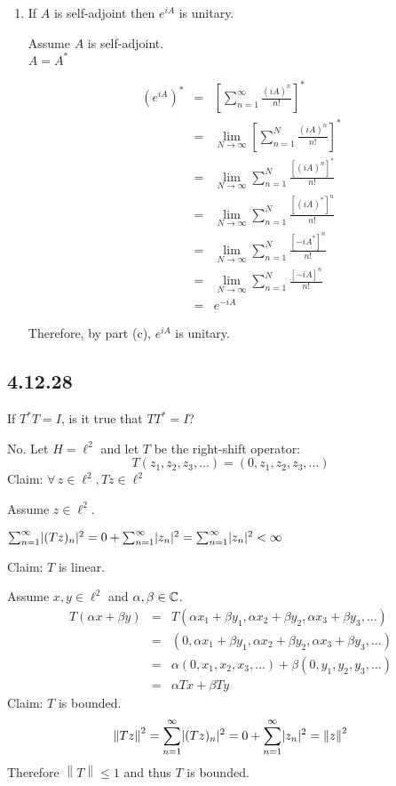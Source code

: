 \documentclass[letterpaper,12pt,fleqn]{article}
\newcommand{\norm}[1]{\left\|#1\right\|}
\renewcommand{\a}{\alpha}
\renewcommand{\b}{\beta}
\begin{document}
\begin{enumerate}[label=(\alph*)]
\item If $A$ is self-adjoint then $e^{iA}$ is unitary.

  Assume $A$ is self-adjoint. \\
  $A=A^*$
  
  \begin{eqnarray*}
    (e^{iA})^* &=& \left[\sum_{n=1}^{\infty}\frac{(iA)^n}{n!}\right]^* \\
    &=& \lim_{N\to\infty}\left[\sum_{n=1}^N\frac{(iA)^n}{n!}\right]^* \\
    &=& \lim_{N\to\infty}\sum_{n=1}^N\frac{[(iA)^n]^*}{n!} \\
    &=& \lim_{N\to\infty}\sum_{n=1}^N\frac{[(iA)^*]^n}{n!} \\
    &=& \lim_{N\to\infty}\sum_{n=1}^N\frac{[-iA^*]^n}{n!} \\
    &=& \lim_{N\to\infty}\sum_{n=1}^N\frac{[-iA]^n}{n!} \\
    &=& e^{-iA}
  \end{eqnarray*}

  Therefore, by part (c), $e^{iA}$ is unitary.
\end{enumerate}

\subsection*{4.12.28}

If $T^*T=I$, is it true that $TT^*=I$?

No. Let $H=\ell^2$ and let $T$ be the right-shift operator:
\[T(z_1,z_2,z_3,\ldots)=(0,z_1,z_2,z_3,\ldots)\]
Claim: $\forall\,z\in\ell^2,Tz\in\ell^2$

Assume $z\in\ell^2$.

$\sum_{n=1}^{\infty}\lvert(Tz)_n\rvert^2=0+\sum_{n=1}^{\infty}\lvert z_n\rvert^2=
\sum_{n=1}^{\infty}\lvert z_n\rvert^2<\infty$

Claim: $T$ is linear.

Assume $x,y\in\ell^2$ and $\a,\b\in\C$.
\begin{eqnarray*}
  T(\a x+\b y) &=& T(\a x_1+\b y_1,\a x_2+\b y_2,\a x_3+\b y_3,\ldots) \\
  &=& (0,\a x_1+\b y_1,\a x_2+\b y_2,\a x_3+\b y_3,\ldots) \\
  &=& \a(0,x_1,x_2,x_3,\ldots)+\b(0,y_1,y_2,y_3,\ldots) \\
  &=& \a Tx+\b Ty
\end{eqnarray*}
Claim: $T$ is bounded.
\[\norm{Tz}^2=\sum_{n=1}^{\infty}\abs{(Tz)_n}^2=0+\sum_{n=1}^{\infty}\abs{z_n}^2
=\norm{z}^2\]
Therefore $\norm{T}\le1$ and thus $T$ is bounded.
\end{document}
